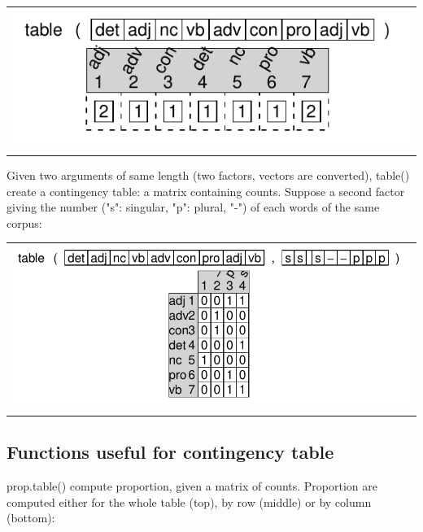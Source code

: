 \documentclass[pdflatex]{article}
\begin{document}
\begin{tabular}{c}
\includegraphics{table_1.pdf}
\end{tabular}


Given two arguments of same length (two factors, vectors are converted), table() create a contingency table: a matrix containing counts. Suppose a second factor giving the number ("s": singular, "p": plural, "-") of each words of the same corpus:

\begin{tabular}{c}
\includegraphics{table_2.pdf}
\end{tabular}

\subsection{Functions useful for contingency table}

prop.table() compute proportion, given a matrix of counts. Proportion are computed either for the whole table (top), by row (middle) or by column (bottom):
\end{document}
